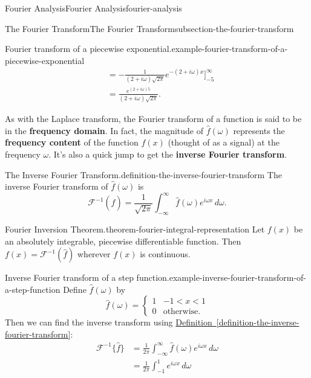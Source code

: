 \documentclass[oneside,10pt,]{book}
\newcommand{\terminology}[1]{\textbf{#1}}
\numberwithin{equation}{section}
\newcommand{\amp}{&}
\begin{document}
\begin{chapterptx}{Fourier Analysis}{}{Fourier Analysis}{}{}{fourier-analysis}
\begin{sectionptx}{The Fourier Transform}{}{The Fourier Transform}{}{}{subsection-the-fourier-transform}
\begin{example}{Fourier transform of a piecewise exponential.}{example-fourier-transform-of-a-piecewise-exponential}
\begin{align*}
\amp = -\frac{1}{(2+i\omega)\sqrt{2\pi}}e^{-(2+i\omega)x}\Big]_{-5}^{\infty}\\
\amp = \frac{e^{(2+i\omega)5}}{(2+i\omega)\sqrt{2\pi}}. 
\end{align*}
%
\end{example}
\hypertarget{p-619}{}%
As with the Laplace transform, the Fourier transform of a function is said to be in the \terminology{frequency domain}. In fact, the magnitude of \(\hat{f}(\omega)\) represents the \terminology{frequency content} of the function \(f(x)\) (thought of as a signal) at the frequency \(\omega\). It's also a quick jump to get the \terminology{inverse Fourier transform}.%
\begin{definition}{The Inverse Fourier Transform.}{definition-the-inverse-fourier-transform}%
\hypertarget{p-620}{}%
The inverse Fourier transform of \(\hat{f}(\omega)\) is%
\begin{equation*}
\mathcal{F}^{-1}(\hat{f}) = \frac{1}{\sqrt{2\pi}}\int_{-\infty}^{\infty}\hat{f}(\omega)e^{i\omega x}\,d\omega.
\end{equation*}
%
\end{definition}
\begin{theorem}{Fourier Inversion Theorem.}{}{theorem-fourier-integral-representation}%
\hypertarget{p-621}{}%
Let \(f(x)\) be an absolutely integrable, piecewise differentiable function. Then \(f(x) = \mathcal{F}^{-1}(\hat{f})\) wherever \(f(x)\) is continuous.%
\end{theorem}
\begin{example}{Inverse Fourier transform of a step function.}{example-inverse-fourier-transform-of-a-step-function}%
\hypertarget{p-622}{}%
Define \(\hat{f}(\omega)\) by%
\begin{equation*}
\hat{f}(\omega) = \begin{cases} 1 \amp -1 < x < 1 \\ 0 \amp \text{otherwise.}\end{cases}
\end{equation*}
Then we can find the inverse transform using \hyperref[definition-the-inverse-fourier-transform]{Definition~\ref{definition-the-inverse-fourier-transform}}:%
\begin{align*}
\mathcal{F}^{-1}\{\hat{f}\} \amp = \frac{1}{2\pi}\int_{-\infty}^{\infty}\hat{f}(\omega)e^{i\omega x}\,d\omega \\
\amp = \frac{1}{2\pi}\int_{-1}^{1}e^{i\omega x}\,d\omega \\

\end{align*}
\end{example}
\end{sectionptx}
\end{chapterptx}
\end{document}
